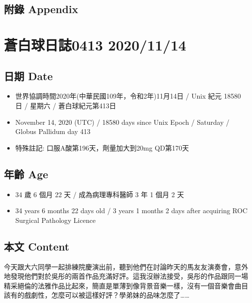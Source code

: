 \documentclass[
]{article}
\providecommand{\tightlist}{%
  \setlength{\itemsep}{0pt}\setlength{\parskip}{0pt}}
\begin{document}
\hypertarget{ux9644ux9304-appendix-67}{%
\subsection{附錄 Appendix}\label{ux9644ux9304-appendix-67}}

\hypertarget{ux84bcux767dux7403ux65e5ux8a8c0413-20201114}{%
\section{蒼白球日誌0413
2020/11/14}\label{ux84bcux767dux7403ux65e5ux8a8c0413-20201114}}

\hypertarget{ux65e5ux671f-date-68}{%
\subsection{日期 Date}\label{ux65e5ux671f-date-68}}

\begin{itemize}
\tightlist
\item
  世界協調時間2020年(中華民國109年，令和2年)11月14日 / Unix 紀元 18580
  日 / 星期六 / 蒼白球紀元第413日
\item
  November 14, 2020 (UTC) / 18580 days since Unix Epoch / Saturday /
  Globus Pallidum day 413
\item
  特殊註記: 口服A酸第196天，劑量加大到20mg QD第170天
\end{itemize}

\hypertarget{ux5e74ux9f61-age-68}{%
\subsection{年齡 Age}\label{ux5e74ux9f61-age-68}}

\begin{itemize}
\tightlist
\item
  34 歲 6 個月 22 天 / 成為病理專科醫師 3 年 1 個月 2 天
\item
  34 years 6 months 22 days old / 3 years 1 months 2 days after
  acquiring ROC Surgical Pathology Licence
\end{itemize}

\hypertarget{ux672cux6587-content-68}{%
\subsection{本文 Content}\label{ux672cux6587-content-68}}

今天跟大六同學一起排練院慶演出前，聽到他們在討論昨天的馬友友演奏會，意外地發現他們對於吳彤的兩首作品充滿好評。這我沒辦法接受，吳彤的作品跟同一場精采絕倫的法雅作品比起來，簡直是單薄到像背景音樂一樣，沒有一個音樂會曲目該有的戲劇性，怎麼可以被這樣好評？學弟妹的品味怎麼了\ldots\ldots{}
\end{document}
